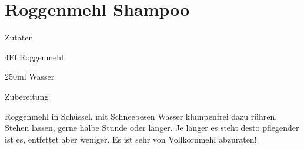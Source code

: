\chapter*{Roggenmehl Shampoo}
\begin{multicols}{2}
 {\Large Zutaten}
 \begin{Zutaten}
		\item 4El Roggenmehl
		\item 250ml Wasser
		
		
\end{Zutaten}
\columnbreak
\end{multicols}

{\Large Zubereitung} \newline
\begin{addmargin}[1cm]{0cm}
Roggenmehl in Schüssel, mit Schneebesen Wasser klumpenfrei dazu rühren.\newline
Stehen lassen, gerne halbe Stunde oder länger.\newline
Je länger es steht desto pflegender ist es, entfettet aber weniger.\newline\newline
Es ist sehr von Vollkornmehl abzuraten!

	
\end{addmargin}
